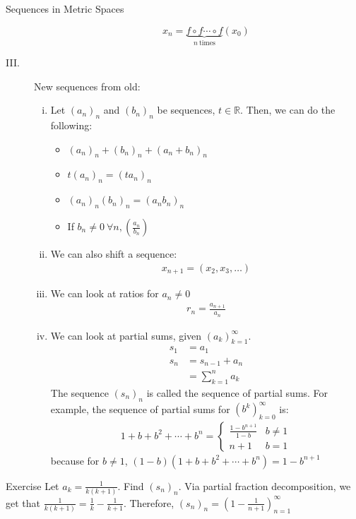 \documentclass[10pt]{extarticle}
\newcommand{\R}{\mathbb{R}}
\begin{document}
\begin{problem}{Sequences in Metric Spaces}
\begin{description}
\begin{enumerate}[(i)]
            \[x_n = \underbrace{f\circ f\cdots \circ f}_{n~\text{times}}(x_0)\]
        \end{enumerate}
      \item[III.] New sequences from old: 
        \begin{enumerate}[(i)]
          \item Let $(a_n)_n$ and $(b_n)_n$ be sequences, $t\in\R$. Then, we can do the following:
            \begin{itemize}
              \item $(a_n)_n + (b_n)_n + (a_n + b_n)_n$
              \item $t(a_n)_n = (ta_n)_n$
              \item $(a_n)_n(b_n)_n = (a_nb_n)_n$
              \item If $b_n \neq 0~\forall n, \left(\frac{a_n}{b_n}\right)$
            \end{itemize}
          \item We can also shift a sequence:
            \begin{align*}
              x_{n+1} = (x_2,x_3,\dots)
            \end{align*}
          \item We can look at ratios for $a_n\neq 0$
            \begin{align*}
              r_n = \frac{a_{n+1}}{a_n}
            \end{align*}
          \item We can look at partial sums, given $(a_k)_{k=1}^{\infty}$.
            \begin{align*}
              s_1 &= a_1\\
              s_n &= s_{n-1} + a_n\\
                  &= \sum_{k=1}^{n}a_k
            \end{align*}
            The sequence $(s_n)_n$ is called the sequence of partial sums. For example, the sequence of partial sums for $(b^k)_{k=0}^{\infty}$ is:
            \begin{align*}
              1 + b + b^2 + \cdots + b^n = \begin{cases}
                \frac{1-b^{n+1}}{1-b}&b\neq 1\\
                n+1&b=1
              \end{cases}
            \end{align*}
            because for $b \neq 1$, $(1-b)(1+b+b^2+\cdots+b^n) = 1-b^{n+1}$
        \end{enumerate}
    \end{description}
    \begin{problem}{Exercise}
      Let $a_k = \frac{1}{k(k+1)}$. Find $(s_n)_n$.
      \tcblower
      Via partial fraction decomposition, we get that $\frac{1}{k(k+1)} = \frac{1}{k}-\frac{1}{k+1}$. Therefore, $(s_n)_n = \left(1-\frac{1}{n+1}\right)_{n=1}^{\infty}$
    \end{problem}
  \end{problem}
\end{document}
